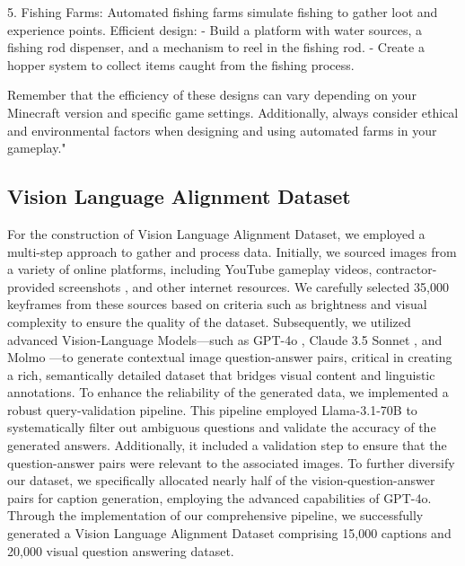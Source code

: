 \begin{prompt}[title={Example of World Knowledge Dataset}, label=World Knowledge Post Training Datasets]
\begin{center}
\begin{minipage}{\dimexpr0.95\linewidth}
5. Fishing Farms:
Automated fishing farms simulate fishing to gather loot and experience points.
Efficient design:
- Build a platform with water sources, a fishing rod dispenser, and a mechanism to reel in the fishing rod.
- Create a hopper system to collect items caught from the fishing process.


Remember that the efficiency of these designs can vary depending on your Minecraft version and specific game settings. Additionally, always consider ethical and environmental factors when designing and using automated farms in your gameplay."
\vspace{3pt}
\end{minipage}
\end{center}

\end{prompt}

\subsection{Vision Language Alignment Dataset}

For the construction of Vision Language Alignment Dataset, we employed a multi-step approach to gather and process data. Initially, we sourced images from a variety of online platforms, including YouTube gameplay videos, contractor-provided screenshots \citep{vpt}, and other internet resources. We carefully selected 35,000 keyframes from these sources based on criteria such as brightness and visual complexity to ensure the quality of the dataset. Subsequently, we utilized advanced Vision-Language Models—such as GPT-4o \citep{chatgpt}, Claude 3.5 Sonnet \citep{claude}, and Molmo \citep{molmo}—to generate contextual image question-answer pairs, critical in creating a rich, semantically detailed dataset that bridges visual content and linguistic annotations. To enhance the reliability of the generated data, we implemented a robust query-validation pipeline. This pipeline employed Llama-3.1-70B \citep{llama-3.1} to systematically filter out ambiguous questions and validate the accuracy of the generated answers. Additionally, it included a validation step to ensure that the question-answer pairs were relevant to the associated images. To further diversify our dataset, we specifically allocated nearly half of the vision-question-answer pairs for caption generation, employing the advanced capabilities of GPT-4o. Through the implementation of our comprehensive pipeline, we successfully generated a Vision Language Alignment Dataset comprising 15,000 captions and 20,000 visual question answering dataset.



